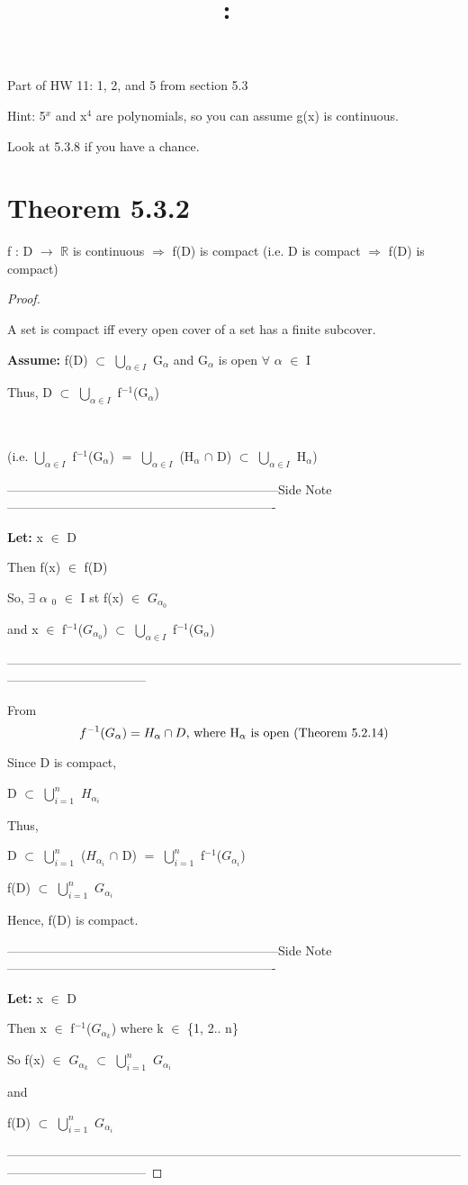 \documentclass{article}
\title{
    \vspace{2in}
    \textmd{\textbf{\hmwkClass:\ \hmwkTitle}}\\
    \normalsize\vspace{0.1in}\small\vspace{0.1in}\large{\textit{\hmwkClassInstructor}}
    \vspace{3in}
}
\author{\hmwkAuthorName}
\date{}
\newcommand{\mt}[1]{\ensuremath{#1}}
\newcommand\bsc[2][\DefaultOpt]{%
  \def\DefaultOpt{#2}%
  \section[#1]{#2}%
}
\newcommand{\bgpf}{\begin{proof} $ $\newline}
\newcommand{\lt}[1]{\textbf{Let: } #1}
\newcommand{\as}[1]{\textbf{Assume: } #1}
\newcommand{\epf}{\end{proof}}
\newcommand{\dbs}[3]{\mt{#1_{#2_#3}}}
\newcommand{\sidenote}[1]{-----------------------------------------------------------------Side Note----------------------------------------------------------------
#1 \

---------------------------------------------------------------------------------------------------------------------------------------------}
\newcommand{\br}{\mt{\mathbb{R}} }       %
\newcommand{\fa}{\mt{\forall} }          %
\newcommand{\afa}{\mt{\alpha} }
\newcommand{\mem}{\mt{\in} }
\newcommand{\exs}{\mt{\exists} }
\newcommand{\sbs}{\mt{\subset} }         %
\newcommand{\lra}{ \mt{\longrightarrow} } %
\newcommand{\rar}{ \mt{\Rightarrow} }     %
\newcommand{\bk}[1]{\{#1\}}
\newcommand{\eql}{\mt{=} }
\newcommand{\uw}[2]{#1\mt{_{#2}}}
\newcommand{\uf}[2]{#1\mt{^{#2}}}
\newcommand{\urng}[2]{\mt{\bigcup_{#1}^{#2}}}
\newcommand{\eqn}[1]{\[#1\]}
\newcommand{\inn}{\mt{\cap} }
\begin{document}
Part of HW 11: 1, 2, and 5 from section 5.3

Hint: \uf{5}{x} and \uf{x}{4} are polynomials, so you can assume g(x) is continuous.

Look at 5.3.8 if you have a chance.

\bsc{Theorem 5.3.2}{

f : D \lra \br is continuous \rar f(D) is compact (i.e. D is compact \rar f(D) is compact)

\bgpf

A set is compact iff every open cover of a set has a finite subcover.

\as{f(D) \sbs \urng{\afa \mem I}{} \uw{G}{\afa} and \uw{G}{\afa} is open \fa \afa \mem I}

Thus, D \sbs \urng{\afa \mem I}{} \uf{f}{-1}(\uw{G}{\afa})

\

(i.e. \urng{\afa \mem I}{} \uf{f}{-1}(\uw{G}{\afa}) \eql \urng{\afa \mem I}{} (\uw{H}{\afa} \inn D) \sbs \urng{\afa \mem I}{} \uw{H}{\afa})

\sidenote{
\lt{x \mem D}

Then f(x) \mem f(D)

So, \exs \uw{\afa}{0} \mem I st f(x) \mem \dbs{G}{\afa}{0}

and x \mem \uf{f}{-1}(\dbs{G}{\afa}{0}) \sbs \urng{\afa \mem I}{} \uf{f}{-1}(\uw{G}{\afa})
}

From 
\eqn{f^{-1}(G_\alpha) = H_\alpha \inn D \textrm{, where \uw{H}{\afa} is open (Theorem 5.2.14)}}

Since D is compact,

D \sbs \urng{i = 1}{n} \dbs{H}{\afa}{i}

Thus,

D \sbs \urng{i = 1}{n} (\dbs{H}{\afa}{i} \inn D) \eql \urng{i = 1}{n} \uf{f}{-1}(\dbs{G}{\afa}{i})

f(D) \sbs \urng{i = 1}{n} \dbs{G}{\afa}{i}

Hence, f(D) is compact.

\sidenote{
\lt{x \mem D}

Then x \mem \uf{f}{-1}(\dbs{G}{\afa}{k}) where k \mem \bk{1, 2.. n}

So f(x) \mem \dbs{G}{\afa}{k} \sbs \urng{i = 1}{n} \dbs{G}{\afa}{i}

and

f(D) \sbs \urng{i = 1}{n} \dbs{G}{\afa}{i}
}
\epf
}

\newpage 
\end{document}
